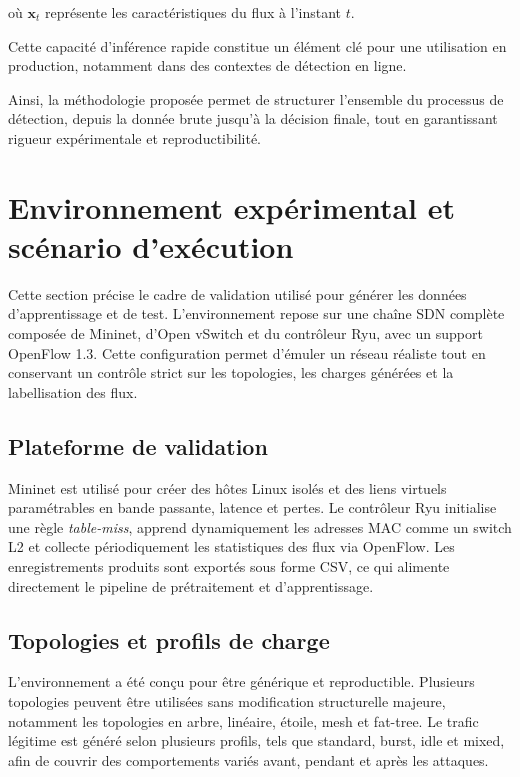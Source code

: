 \documentclass[11pt]{article}
\begin{document}
où $\mathbf{x}_t$ représente les caractéristiques du flux à l’instant $t$.

Cette capacité d’inférence rapide constitue un élément clé pour une utilisation en production, notamment dans des contextes de détection en ligne.

\medskip

Ainsi, la méthodologie proposée permet de structurer l’ensemble du processus de détection, depuis la donnée brute jusqu’à la décision finale, tout en garantissant rigueur expérimentale et reproductibilité.

\section{Environnement expérimental et scénario d'exécution}\label{sec:environment}

Cette section précise le cadre de validation utilisé pour générer les données d’apprentissage et de test. L’environnement repose sur une chaîne SDN complète composée de Mininet, d’Open vSwitch et du contrôleur Ryu, avec un support OpenFlow 1.3. Cette configuration permet d’émuler un réseau réaliste tout en conservant un contrôle strict sur les topologies, les charges générées et la labellisation des flux.

\subsection{Plateforme de validation}

Mininet est utilisé pour créer des hôtes Linux isolés et des liens virtuels paramétrables en bande passante, latence et pertes. Le contrôleur Ryu initialise une règle \textit{table-miss}, apprend dynamiquement les adresses MAC comme un switch L2 et collecte périodiquement les statistiques des flux via OpenFlow. Les enregistrements produits sont exportés sous forme CSV, ce qui alimente directement le pipeline de prétraitement et d’apprentissage.

\subsection{Topologies et profils de charge}

L’environnement a été conçu pour être générique et reproductible. Plusieurs topologies peuvent être utilisées sans modification structurelle majeure, notamment les topologies en arbre, linéaire, étoile, mesh et fat-tree. Le trafic légitime est généré selon plusieurs profils, tels que standard, burst, idle et mixed, afin de couvrir des comportements variés avant, pendant et après les attaques.
\end{document}
